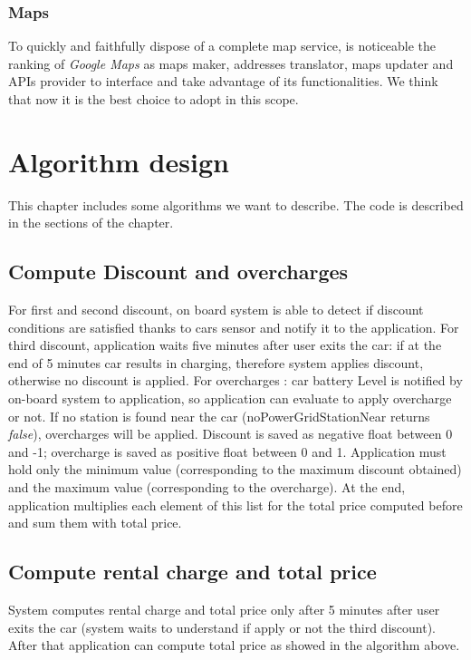 \documentclass{scrreprt}
\begin{document}
\subsection{Maps}
To quickly and faithfully dispose of a complete map service, is noticeable the ranking of \emph{Google Maps} as maps maker, addresses translator, maps updater and APIs provider to interface and take advantage of its functionalities. We think that now it is the best choice to adopt in this scope.


\chapter{Algorithm design}
This chapter includes some algorithms we want to describe. The code is described in the sections of the chapter.


\section{Compute Discount and overcharges}
For first and second discount, on board system is able to detect if discount conditions are satisfied thanks to cars sensor and notify it to the application.
For third discount, application waits five minutes after user exits the car: if at the end of 5 minutes car results in charging, therefore system applies discount, otherwise no discount is applied.
For overcharges : car battery Level is notified by on-board system to application, so application can evaluate to apply overcharge or not. If no station is found near the car (noPowerGridStationNear returns \emph{false}), overcharges will be applied.
Discount is saved as negative float between 0 and -1; overcharge is saved as positive float between 0 and 1.
Application must hold only the minimum value (corresponding to the maximum discount obtained) and the maximum value (corresponding to the overcharge).
At the end, application multiplies each element of this list for the total price computed before and sum them with total price.

\section{Compute rental charge and total price}
System computes rental charge and total price only after 5 minutes after user exits the car (system waits to understand if apply or not the third discount).
After that application can compute total price as showed in the algorithm above.
\end{document}
